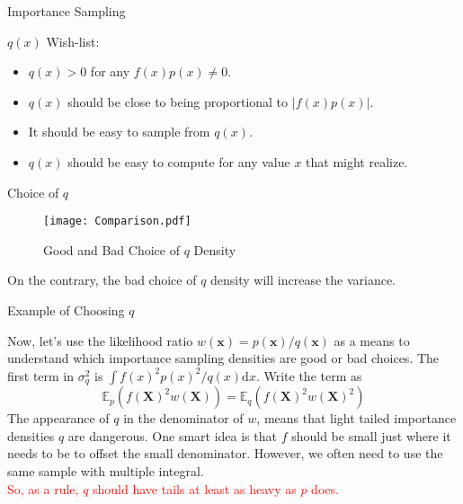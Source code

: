 \begin{frame}{Importance Sampling}

\begin{block}{$q(x)$ Wish-list:}
\begin{itemize}
\item $q(x)>0$ for any $f(x)p(x) \neq 0$.
\item $q(x)$ should be close to being proportional to $|f(x)p(x)|$.
\item It should be easy to sample from $q(x)$.
\item $q(x)$ should be easy to compute for any value $x$ that might realize.
\end{itemize}
\end{block}

\end{frame}

\begin{frame}{Choice of $q$}



\begin{figure}[ht]
		  \centering
          \texttt{[image: Comparison.pdf]}
           \caption{Good and Bad Choice of $q$ Density}
 \end{figure}

On the contrary, the bad choice of $q$ density will increase the variance.
\end{frame}

\begin{frame}{Example of Choosing $q$}

Now, let's use the likelihood ratio $w(\boldsymbol{x})=p(\boldsymbol{x}) / q(\boldsymbol{x})$ as a means to understand which importance sampling densities are good or bad choices. The first term in $\sigma_{q}^{2}$ is $\int f(x)^{2} p(x)^{2} / q(x) \mathrm{d} x$. Write the term as\\
\[\mathbb{E}_{p}\left(f(\boldsymbol{X})^{2} w(\boldsymbol{X})\right)=\mathbb{E}_{q}\left(f(\boldsymbol{X})^{2} w(\boldsymbol{X})^{2}\right)\]The appearance of $q$ in the denominator of $w$, means that light tailed importance densities $q$ are dangerous. One smart idea is that $f$ should be small just where it needs to be to offset the small denominator. However, we often need to use the same sample with multiple integral. \\
\textcolor{red}{So, as a rule, $q$ should have tails at least as heavy as $p$ does.}


\end{frame}

